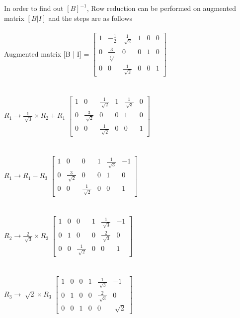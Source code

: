 \documentclass[12pt]{article}
\newcommand\tab[1][1cm]{\hspace*{#1}}
\begin{document}
\tab In order to find out $[B]^{-1}$,  Row reduction can be performed on augmented matrix $[B|I]$ and the steps are as follows\\ \\
\noindent
\tab 
\textnormal{ Augmented matrix [B | I] = }
$\left[ \begin{array}{ccc|ccc}
  1 & -\frac{1}{2} & \frac{1}{\sqrt[]{2}} & 1 & 0 & 0\\
  0 & \frac{3}{\sqrt[2]{}} & 0 & 0 & 1 & 0\\
  0 & 0 & \frac{1}{\sqrt[]{2}} &0 & 0 & 1
  \end{array} \right]$\\ \\ \\

\noindent
\tab 
\textnormal{ $R_1 \rightarrow \frac{1}{\sqrt[]{3}} \times R_2 + R_1$}
$\left[ \begin{array}{ccc|ccc}
  1 & 0 & \frac{1}{\sqrt[]{2}} & 1 & \frac{1}{\sqrt[]{3}} & 0\\
  0 & \frac{3}{\sqrt[]{2}} & 0 & 0 & 1 & 0\\
  0 & 0 & \frac{1}{\sqrt[]{2}} &0 & 0 & 1
  \end{array} \right]$\\ \\ \\

\noindent
\tab 
\textnormal{ $R_1 \rightarrow R_1 - R_3$}
$\left[ \begin{array}{ccc|ccc}
  1 & 0 & 0 & 1 & \frac{1}{\sqrt[]{3}} & -1\\
  0 & \frac{3}{\sqrt[]{2}} & 0 & 0 & 1 & 0\\
  0 & 0 & \frac{1}{\sqrt[]{2}} &0 & 0 & 1
  \end{array} \right]$\\ \\ \\
  
\noindent
\tab 
\textnormal{ $R_2 \rightarrow \frac{2}{\sqrt[]{3}} \times R_2$}
$\left[ \begin{array}{ccc|ccc}
  1 & 0 & 0 & 1 & \frac{1}{\sqrt[]{3}} & -1\\
  0 & 1 & 0 & 0 & \frac{2}{\sqrt[]{3}} & 0\\
  0 & 0 & \frac{1}{\sqrt[]{2}} &0 & 0 & 1
  \end{array} \right]$\\ \\ \\


\noindent
\tab 
\textnormal{ $R_3 \rightarrow \sqrt[]{2} \times R_3$}
$\left[ \begin{array}{ccc|ccc}
  1 & 0 & 0 & 1 & \frac{1}{\sqrt[]{3}} & -1\\
  0 & 1 & 0 & 0 & \frac{2}{\sqrt[]{3}} & 0\\
  0 & 0 & 1 &0 & 0 & \sqrt[]{2}
  \end{array} \right]$\\ \\ \\
\end{document}
